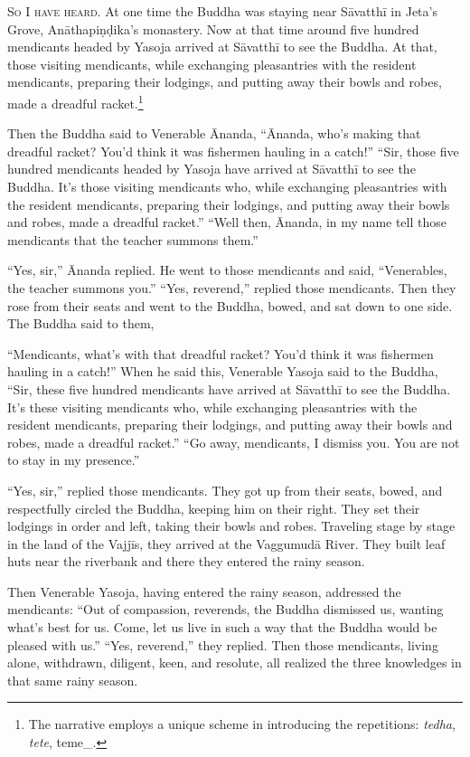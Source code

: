 \documentclass[12pt,openany]{book}%
\newcommand*{\scevam}[1]{\textsc{#1}}
\begin{document}
\scevam{So I have heard. }At one time the Buddha was staying near \textsanskrit{Sāvatthī} in Jeta’s Grove, \textsanskrit{Anāthapiṇḍika}’s monastery. Now at that time around five hundred mendicants headed by Yasoja arrived at \textsanskrit{Sāvatthī} to see the Buddha. At that, those visiting mendicants, while exchanging pleasantries with the resident mendicants, preparing their lodgings, and putting away their bowls and robes, made a dreadful racket.\footnote{The narrative employs a unique scheme in introducing the repetitions: \textit{tedha}, \textit{tete}, teme\_. } 

Then the Buddha said to Venerable Ānanda, “Ānanda, who’s making that dreadful racket? You’d think it was fishermen hauling in a catch!” “Sir, those five hundred mendicants headed by Yasoja have arrived at \textsanskrit{Sāvatthī} to see the Buddha. It’s those visiting mendicants who, while exchanging pleasantries with the resident mendicants, preparing their lodgings, and putting away their bowls and robes, made a dreadful racket.” “Well then, Ānanda, in my name tell those mendicants that the teacher summons them.” 

“Yes, sir,” Ānanda replied. He went to those mendicants and said, “Venerables, the teacher summons you.” “Yes, reverend,” replied those mendicants. Then they rose from their seats and went to the Buddha, bowed, and sat down to one side. The Buddha said to them, 

“Mendicants, what’s with that dreadful racket? You’d think it was fishermen hauling in a catch!” When he said this, Venerable Yasoja said to the Buddha, “Sir, these five hundred mendicants have arrived at \textsanskrit{Sāvatthī} to see the Buddha. It’s these visiting mendicants who, while exchanging pleasantries with the resident mendicants, preparing their lodgings, and putting away their bowls and robes, made a dreadful racket.” “Go away, mendicants, I dismiss you. You are not to stay in my presence.” 

“Yes, sir,” replied those mendicants. They got up from their seats, bowed, and respectfully circled the Buddha, keeping him on their right. They set their lodgings in order and left, taking their bowls and robes. Traveling stage by stage in the land of the \textsanskrit{Vajjīs}, they arrived at the \textsanskrit{Vaggumudā} River. They built leaf huts near the riverbank and there they entered the rainy season. 

Then Venerable Yasoja, having entered the rainy season, addressed the mendicants: “Out of compassion, reverends, the Buddha dismissed us, wanting what’s best for us. Come, let us live in such a way that the Buddha would be pleased with us.” “Yes, reverend,” they replied. Then those mendicants, living alone, withdrawn, diligent, keen, and resolute, all realized the three knowledges in that same rainy season. 
\end{document}

